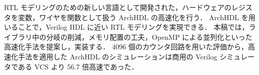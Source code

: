 RTL モデリングのための新しい言語として開発された，ハードウェアのレジスタを変数，ワイヤを関数として扱う ArchHDL の高速化を行う．
ArchHDL を用いることで，Verilog HDL に近い RTL モデリングを実現できる．
本稿では，ライブラリ中の分岐の削減，メモリ配置の工夫，OpenMP による並列化といった高速化手法を提案し，実装する．
4096 個のカウンタ回路を用いた評価から，高速化手法を適用した ArchHDL のシミュレーションは商用の Verilog シミュレータである VCS より 56.7 倍高速であった．